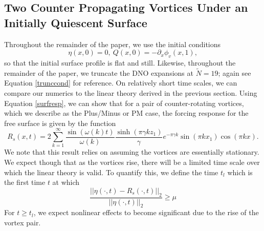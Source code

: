 \documentclass[a4paper,11pt]{article}
\newcommand{\p}{\partial}
\newcommand{\gnorm}[1]{\left|\left| #1\right|\right|}
\begin{document}
\subsection{Two Counter Propagating Vortices Under an Initially Quiescent Surface}
Throughout the remainder of the paper, we use the initial conditions
\[
\eta(x,0) = 0, ~ Q(x,0) = -\p_{x}\phi_{v}(x,1),
\]
so that the initial surface profile is flat and still.  Likewise, throughout the remainder of the paper, we truncate the DNO expansions at $\tilde{N}=19$; again see Equation \eqref{trunccond} for reference.  On relatively short time scales, we can compare our numerics to the linear theory derived in the previous section.  Using Equation \eqref{surfresp}, we can show that for a pair of counter-rotating vortices, which we describe as the Plus/Minus or PM case, the forcing response for the free surface is given by the function
\begin{equation}
R_{s}(x,t) = 2\sum_{k=1}^{\infty} \frac{\sin(\omega(k)t)}{\omega(k)}\frac{\sinh(\pi \gamma k z_{1})}{\gamma}e^{-\pi \gamma k}\sin(\pi k x_{1})\cos(\pi k x).
\label{twovortsurfresp}
\end{equation}
We note that this result relies on assuming the vortices are essentially stationary.  We expect though that as the vortices rise, there will be a limited time scale over which the linear theory is valid.  To quantify this, we define the time $t_{l}$ which is the first time $t$ at which 
\[
\frac{\gnorm{\eta(\cdot,t)-R_{s}(\cdot,t)}_{2}}{\gnorm{\eta(\cdot,t)}_{2}}\geq \mu
\]    
For $t\geq t_{l}$, we expect nonlinear effects to become significant due to the rise of the vortex pair.    
\end{document}
